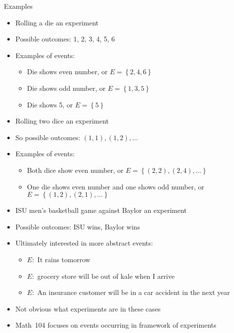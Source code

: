 \documentclass{beamer}
\theoremstyle{definition}
\begin{document}
\begin{frame}{Examples}
\begin{example}
\begin{itemize}
\item Rolling a die an experiment
\item Possible outcomes: 1, 2, 3, 4, 5, 6
\item Examples of events:
\begin{itemize}
\item Die shows even number, or $E=\left\{2,4,6\right\}$
\item Die shows odd number, or $E=\left\{1,3,5\right\}$
\item Die shows 5, or $E=\left\{5\right\}$
\end{itemize}
\end{itemize}
\end{example}
\begin{example}
\begin{itemize}
\item Rolling \alert{two} dice an experiment
\item So possible outcomes: $\left(1,1\right),\left(1,2\right),\ldots$
\item Examples of events:
\begin{itemize}
\item Both dice show even number, or $E=\left\{\left(2,2\right),
\left(2,4\right),\ldots\right\}$
\item One die shows even number and one shows odd number,
or $E=\left\{\left(1,2\right),\left(2,1\right),\ldots\right\}$
\end{itemize}
\end{itemize}
\end{example}
\end{frame}

\begin{frame}
\begin{example}
\begin{itemize}
\item ISU men's basketball game against Baylor an experiment
\item Possible outcomes: ISU wins, Baylor wins
\end{itemize}
\end{example}
\begin{itemize}
\item Ultimately interested in more abstract events:
\begin{itemize}
\item $E:$ It rains tomorrow
\item $E:$ grocery store will be out of kale when I arrive
\item $E:$ An insurance customer will be in a car accident in the next year
\end{itemize}
\item Not obvious what experiments are in these cases
\item Math~104 focuses on events occurring in framework of experiments
\end{itemize}
\end{frame}
\end{document}
